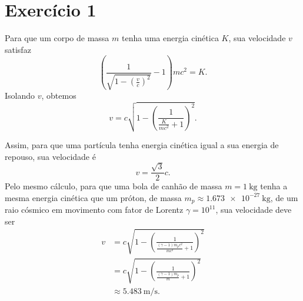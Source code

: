 \section*{Exercício 1}
Para que um corpo de massa \(m\) tenha uma energia cinética \(K\), sua velocidade \(v\) satisfaz
\begin{equation*}
    \left(\frac{1}{\sqrt{1-\left(\frac{v}{c}\right)^2}} - 1\right)mc^2 = K.
\end{equation*}
Isolando \(v\), obtemos
\begin{equation*}
    v = c\sqrt{1 - \left(\frac{1}{\frac{K}{mc^2}+1}\right)^2}.
\end{equation*}

Assim, para que uma partícula tenha energia cinética igual a sua energia de repouso, sua velocidade é
\begin{equation*}
    v = \frac{\sqrt{3}}{2}c.
\end{equation*}
Pelo mesmo cálculo, para que uma bola de canhão de massa \(m = \SI{1}{\kilogram}\) tenha a mesma energia cinética que um próton, de massa \(m_p \approx\SI{1.673e-27}{\kilogram}\), de um raio cósmico em movimento com fator de Lorentz \(\gamma = 10^{11}\), sua velocidade deve ser
\begin{align*}
    v &= c\sqrt{1 - \left(\frac{1}{\frac{(\gamma - 1)m_pc^2}{mc^2}+1}\right)^2}\\
      &= c\sqrt{1 - \left(\frac{1}{\frac{(\gamma - 1)m_p}{m}+1}\right)^2}\\
      &\approx \SI{5.483}{\meter\per\second}.
\end{align*}
